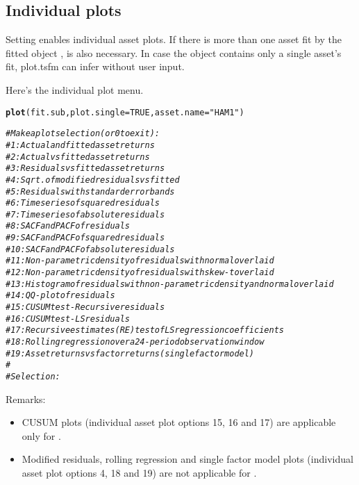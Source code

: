 \documentclass[a4paper]{article}\usepackage[]{graphicx}\usepackage[]{color}
\makeatletter
\newcommand{\hlnum}[1]{\textcolor[rgb]{0.686,0.059,0.569}{#1}}%
\newcommand{\hlstr}[1]{\textcolor[rgb]{0.192,0.494,0.8}{#1}}%
\newcommand{\hlcom}[1]{\textcolor[rgb]{0.678,0.584,0.686}{\textit{#1}}}%
\newcommand{\hlstd}[1]{\textcolor[rgb]{0.345,0.345,0.345}{#1}}%
\newcommand{\hlkwc}[1]{\textcolor[rgb]{0.333,0.667,0.333}{#1}}%
\newcommand{\hlkwd}[1]{\textcolor[rgb]{0.737,0.353,0.396}{\textbf{#1}}}%
\newenvironment{kframe}{%
 \def\at@end@of@kframe{}%
 \ifinner\ifhmode%
  \def\at@end@of@kframe{\end{minipage}}%
  \begin{minipage}{\columnwidth}%
 \fi\fi%
 \def\FrameCommand##1{\hskip\@totalleftmargin \hskip-\fboxsep
 \colorbox{shadecolor}{##1}\hskip-\fboxsep
     \hskip-\linewidth \hskip-\@totalleftmargin \hskip\columnwidth}%
 \MakeFramed {\advance\hsize-\width
   \@totalleftmargin\z@ \linewidth\hsize
   \@setminipage}}%
 {\par\unskip\endMakeFramed%
 \at@end@of@kframe}
\newenvironment{knitrout}{}{} %
\makeatother
\begin{document}
\newpage
\subsection{Individual plots}

Setting  enables individual asset plots. If there is more than one asset fit by the fitted object ,  is also necessary. In case the  object  contains only a single asset's fit, plot.tsfm can infer  without user input. 

Here's the individual plot menu.
\begin{knitrout}
\color{fgcolor}\begin{kframe}
\begin{alltt}
\hlkwd{plot}\hlstd{(fit.sub,} \hlkwc{plot.single}\hlstd{=}\hlnum{TRUE}\hlstd{,} \hlkwc{asset.name}\hlstd{=}\hlstr{"HAM1"}\hlstd{)}

\hlcom{# Make a plot selection (or 0 to exit): }
\hlcom{#  1: Actual and fitted asset returns}
\hlcom{#  2: Actual vs fitted asset returns}
\hlcom{#  3: Residuals vs fitted asset returns}
\hlcom{#  4: Sqrt. of modified residuals vs fitted}
\hlcom{#  5: Residuals with standard error bands}
\hlcom{#  6: Time series of squared residuals}
\hlcom{#  7: Time series of absolute residuals}
\hlcom{#  8: SACF and PACF of residuals}
\hlcom{#  9: SACF and PACF of squared residuals}
\hlcom{# 10: SACF and PACF of absolute residuals}
\hlcom{# 11: Non-parametric density of residuals with normal overlaid}
\hlcom{# 12: Non-parametric density of residuals with skew-t overlaid}
\hlcom{# 13: Histogram of residuals with non-parametric density and normal overlaid}
\hlcom{# 14: QQ-plot of residuals}
\hlcom{# 15: CUSUM test-Recursive residuals}
\hlcom{# 16: CUSUM test-LS residuals}
\hlcom{# 17: Recursive estimates (RE) test of LS regression coefficients}
\hlcom{# 18: Rolling regression over a 24-period observation window}
\hlcom{# 19: Asset returns vs factor returns (single factor model)}
\hlcom{# }
\hlcom{# Selection: }
\end{alltt}
\end{kframe}
\end{knitrout}

Remarks:
\begin{itemize}
\item CUSUM plots (individual asset plot options 15, 16 and 17) are applicable only for .
\item Modified residuals, rolling regression and single factor model plots (individual asset plot options 4, 18 and 19) are not applicable for .
\end{itemize}
\end{document}
